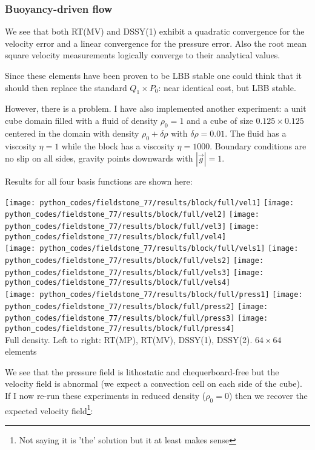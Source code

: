 \subsubsection*{Buoyancy-driven flow}

We see that both RT(MV) and DSSY(1) exhibit a quadratic convergence for the
velocity error and a linear convergence for the pressure error. Also the root mean square 
velocity measurements logically converge to their analytical values.  

Since these elements have been proven to be LBB stable one could think that it 
should then replace the standard $Q_1 \times P_0$: near identical cost, but LBB stable.

However, there is  a problem. I have also implemented another experiment: a unit cube domain
filled with a fluid of density $\rho_0=1$ and a cube of size $0.125\times 0.125$ centered in the domain
with density $\rho_0+\delta \rho$ with $\delta\rho=0.01$. The fluid has a viscosity $\eta=1$ while the 
block has a viscosity $\eta=1000$.
Boundary conditions are no slip on all sides, gravity points downwards with $|\vec{g}|=1$.

Results for all four basis functions are shown here:
\begin{center}
\texttt{[image: python\_codes/fieldstone\_77/results/block/full/vel1]}
\texttt{[image: python\_codes/fieldstone\_77/results/block/full/vel2]}
\texttt{[image: python\_codes/fieldstone\_77/results/block/full/vel3]}
\texttt{[image: python\_codes/fieldstone\_77/results/block/full/vel4]}\\
\texttt{[image: python\_codes/fieldstone\_77/results/block/full/vels1]}
\texttt{[image: python\_codes/fieldstone\_77/results/block/full/vels2]}
\texttt{[image: python\_codes/fieldstone\_77/results/block/full/vels3]}
\texttt{[image: python\_codes/fieldstone\_77/results/block/full/vels4]}\\
\texttt{[image: python\_codes/fieldstone\_77/results/block/full/press1]}
\texttt{[image: python\_codes/fieldstone\_77/results/block/full/press2]}
\texttt{[image: python\_codes/fieldstone\_77/results/block/full/press3]}
\texttt{[image: python\_codes/fieldstone\_77/results/block/full/press4]}\\
{\captionfont Full density. Left to right: RT(MP), RT(MV), DSSY(1), DSSY(2). $64\times 64$ elements}
\end{center}

We see that the pressure field is lithostatic and chequerboard-free  but the velocity field is abnormal 
(we expect a convection cell on each side of the cube).
If I now re-run these experiments in reduced density ($\rho_0=0$) then we recover
the expected velocity field\footnote{Not saying it is 'the' solution but it at least makes sense}:

